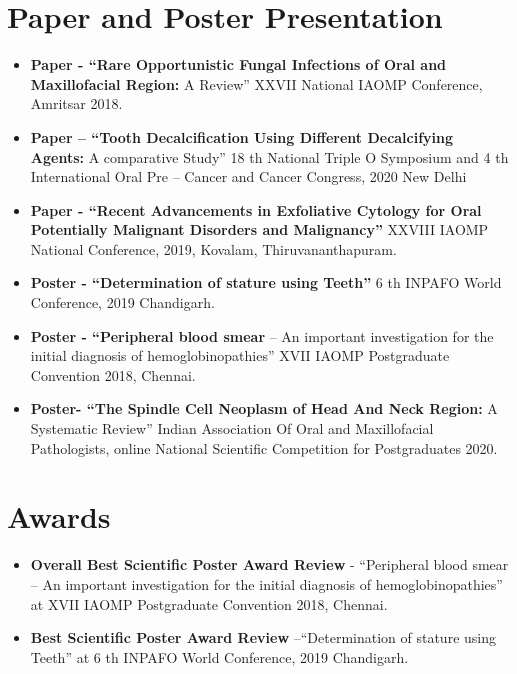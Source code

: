 \documentclass[11pt,a4paper,sans]{moderncv}        %
\begin{document}
\section{Paper and Poster Presentation}
\begin{itemize}

\vspace{3pt}
\item {\textbf{Paper - “Rare Opportunistic Fungal Infections of Oral and Maxillofacial Region:} A
Review” XXVII National IAOMP Conference, Amritsar 2018.}
\vspace{3pt}
\item {\textbf{Paper – “Tooth Decalcification Using Different Decalcifying Agents:} A comparative
Study” 18 th National Triple O Symposium and 4 th International Oral Pre – Cancer and
Cancer Congress, 2020 New Delhi}
\vspace{3pt}
\item {\textbf{Paper - “Recent Advancements in Exfoliative Cytology for Oral Potentially
Malignant Disorders and Malignancy”} XXVIII IAOMP National Conference, 2019,
Kovalam, Thiruvananthapuram.}
\vspace{3pt}
\item {\textbf{Poster - “Determination of stature using Teeth”} 6 th INPAFO World Conference, 2019
Chandigarh.}
\vspace{3pt}
\item{\textbf{Poster - “Peripheral blood smear} – An important investigation for the initial diagnosis
of hemoglobinopathies” XVII IAOMP Postgraduate Convention 2018, Chennai.}
\vspace{3pt}
\item {\textbf{Poster- “The Spindle Cell Neoplasm of Head And Neck Region:} A Systematic
Review” Indian Association Of Oral and Maxillofacial Pathologists, online National
Scientific Competition for Postgraduates 2020.}
\end{itemize}


\section{Awards}
\begin{itemize}
    \item
    \vspace{3pt}
    \textbf{Overall Best Scientific Poster Award Review} - “Peripheral blood smear – An
important investigation for the initial diagnosis of hemoglobinopathies” at XVII
IAOMP Postgraduate Convention 2018, Chennai.
    \item
    \vspace{3pt}
\textbf{Best Scientific Poster Award Review} –“Determination of stature using Teeth” at 6 th
INPAFO World Conference, 2019 Chandigarh.
\end{itemize}
\end{document}
